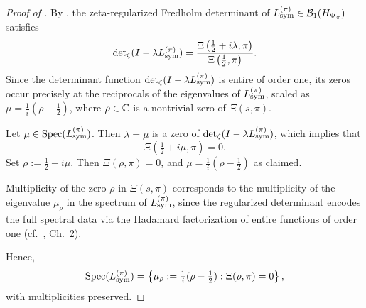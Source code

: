 \begin{proof}[Proof of ]
By , the zeta-regularized Fredholm determinant of \( L_{\mathrm{sym}}^{(\pi)} \in \mathcal{B}_1(H_{\Psi_{\pi}}) \) satisfies
\[
\det\nolimits_{\zeta}(I - \lambda L_{\mathrm{sym}}^{(\pi)}) = \frac{\Xi\left(\tfrac{1}{2} + i\lambda, \pi\right)}{\Xi\left(\tfrac{1}{2}, \pi\right)}.
\]
Since the determinant function \( \det\nolimits_{\zeta}(I - \lambda L_{\mathrm{sym}}^{(\pi)}) \) is entire of order one, its zeros occur precisely at the reciprocals of the eigenvalues of \( L_{\mathrm{sym}}^{(\pi)} \), scaled as \( \mu = \frac{1}{i}(\rho - \frac{1}{2}) \), where \( \rho \in \mathbb{C} \) is a nontrivial zero of \( \Xi(s, \pi) \).

Let \( \mu \in \operatorname{Spec}(L_{\mathrm{sym}}^{(\pi)}) \). Then \( \lambda = \mu \) is a zero of \( \det\nolimits_{\zeta}(I - \lambda L_{\mathrm{sym}}^{(\pi)}) \), which implies that
\[
\Xi\left(\tfrac{1}{2} + i\mu, \pi\right) = 0.
\]
Set \( \rho := \tfrac{1}{2} + i\mu \). Then \( \Xi(\rho, \pi) = 0 \), and \( \mu = \frac{1}{i}(\rho - \frac{1}{2}) \) as claimed.

Multiplicity of the zero \( \rho \) in \( \Xi(s, \pi) \) corresponds to the multiplicity of the eigenvalue \( \mu_\rho \) in the spectrum of \( L_{\mathrm{sym}}^{(\pi)} \), since the regularized determinant encodes the full spectral data via the Hadamard factorization of entire functions of order one (cf.\ \cite{Levin1996EntireLectures}, Ch.~2).

Hence,
\[
\operatorname{Spec}(L_{\mathrm{sym}}^{(\pi)}) = \left\{ \mu_\rho := \tfrac{1}{i}(\rho - \tfrac{1}{2}) : \Xi(\rho, \pi) = 0 \right\},
\]
with multiplicities preserved.
\end{proof}
